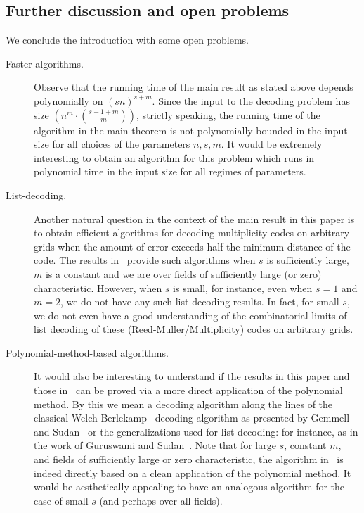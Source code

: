 \documentclass{theoretics}
\begin{document}
	\subsection{Further discussion and open problems}
	We conclude the introduction with some open problems.
	\begin{description}
		\item [Faster algorithms.] Observe that the running time of the main result  as stated above depends polynomially on $(sn)^{s+m}$. Since the input to the decoding problem has size $\left(n^m\cdot \binom{s - 1 + m}{m} \right)$, strictly speaking, the running time of the algorithm in the main theorem is not polynomially bounded in the input size for all choices of the parameters $n, s, m$. It would be extremely interesting to obtain an algorithm for this problem which runs in polynomial time in the input size for all regimes of parameters. 
		
		\item[List-decoding. ] Another natural question in the context of the main result in this paper is to obtain efficient algorithms for decoding multiplicity codes on arbitrary grids when the amount of error exceeds half the minimum distance of the code. The results in~\cite{BhandariHKS2021-mgrid} provide such algorithms when $s$ is sufficiently large, $m$ is a constant and we are over fields of sufficiently large (or zero) characteristic. However, when $s$ is small, for instance, even when $s= 1$ and $m=2$, we do not have any such list decoding results. In fact, for small $s$, we do not even have a good understanding of the combinatorial limits of list decoding of these (Reed-Muller/Multiplicity) codes on arbitrary grids. 
		
		
		\item[Polynomial-method-based algorithms. ] It would also be interesting to understand if the results in this paper and those in~\cite{KimK2017} can be proved via a more direct application of the polynomial method. By this we mean a decoding algorithm along the lines of the classical Welch-Berlekamp~\cite{WelchB1986} decoding algorithm as presented by Gemmell and Sudan~\cite{GemmellS1992} or the generalizations used for list-decoding: for instance, as in the work of Guruswami and Sudan~\cite{GuruswamiS1999}.
		Note that for large $s$, constant $m$, and fields of sufficiently large or zero characteristic, the algorithm in~\cite{BhandariHKS2021-mgrid} is indeed directly based on a clean application of the polynomial method. It would be aesthetically appealing to have an analogous algorithm for the case of small $s$ (and perhaps over all fields).
	\end{description}
	
\end{document}
